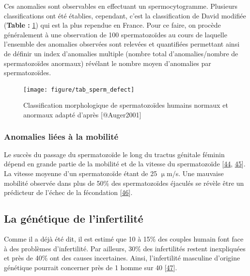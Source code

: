 \documentclass[12pt,twoside]{reedthesis}
\theoremstyle{definition}
\theoremstyle{definition}
\theoremstyle{remark}
\begin{document}
  Ces anomalies sont observables en effectuant un spermocytogramme.
  Plusieurs classifications ont été établies, cependant, c'est la
  classification de David modifiée (\textbf{Table :}
  \ref{fig:anomaliemorphosperm}) qui est la plus rependue en France. Pour
  ce faire, on procède généralement à une observation de 100
  spermatozoïdes au cours de laquelle l'ensemble des anomalies observées
  sont relevées et quantifiées permettant ainsi de définir un index
  d'anomalies multiple (nombre total d'anomalies/nombre de spermatozoïdes
  anormaux) révélant le nombre moyen d'anomalies par spermatozoïdes.
  
  \newpage  
  
  \begin{figure}
  
  {\centering \texttt{[image: figure/tab\_sperm\_defect]} 
  
  }
  
  \caption[Classification morphologique de spermatozoïdes humains normaux et anormaux adapté]{Classification morphologique de spermatozoïdes humains normaux et anormaux adapté d'après [@Auger2001]}\label{fig:anomaliemorphosperm}
  \end{figure}
  
  \newpage
  
  \subsubsection{Anomalies liées à la
  mobilité}\label{anomalies-liees-a-la-mobilite}
  
  Le succès du passage du spermatozoïde le long du tractus génitale
  féminin dépend en grande partie de la mobilité et de la vitesse du
  spermatozoïde {[}\protect\hyperlink{ref-Lindholmer1974}{44},
  \protect\hyperlink{ref-Bjorndahl2010}{45}{]}. La vitesse moyenne d'un
  spermatozoïde étant de 25 \(\upmu\)m/s. Une mauvaise mobilité observée
  dans plus de 50\% des spermatozoïdes éjaculés se révèle être un
  prédicteur de l'échec de la fécondation
  {[}\protect\hyperlink{ref-Aitken1985}{46}{]}.
  
  \subsection{La génétique de
  l'infertilité}\label{la-genetique-de-linfertilite}
  
  Comme il a déjà été dit, il est estimé que 10 à 15\% des couples humain
  font face à des problèmes d'infertilité. Par ailleurs, 30\% des
  infertilités restent inexpliquées et près de 40\% ont des causes
  incertaines. Ainsi, l'infertilité masculine d'origine génétique pourrait
  concerner près de 1 homme sur 40
  {[}\protect\hyperlink{ref-Tuttelmann2011}{47}{]}.
  
\end{document}
